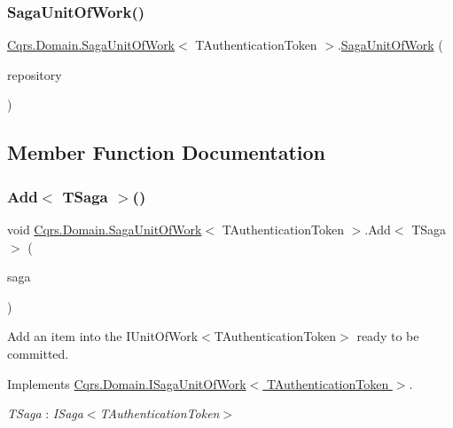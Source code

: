 \subsubsection{\texorpdfstring{Saga\+Unit\+Of\+Work()}{SagaUnitOfWork()}}
{\footnotesize\ttfamily \hyperlink{classCqrs_1_1Domain_1_1SagaUnitOfWork}{Cqrs.\+Domain.\+Saga\+Unit\+Of\+Work}$<$ T\+Authentication\+Token $>$.\hyperlink{classCqrs_1_1Domain_1_1SagaUnitOfWork}{Saga\+Unit\+Of\+Work} (\begin{DoxyParamCaption}\item[{\hyperlink{interfaceCqrs_1_1Domain_1_1ISagaRepository}{I\+Saga\+Repository}$<$ T\+Authentication\+Token $>$}]{repository }\end{DoxyParamCaption})}



\subsection{Member Function Documentation}
\mbox{\label{classCqrs_1_1Domain_1_1SagaUnitOfWork_af62fee98e76ec58ec4d684b36eb7b20e}} 
\subsubsection{\texorpdfstring{Add$<$ T\+Saga $>$()}{Add< TSaga >()}}
{\footnotesize\ttfamily void \hyperlink{classCqrs_1_1Domain_1_1SagaUnitOfWork}{Cqrs.\+Domain.\+Saga\+Unit\+Of\+Work}$<$ T\+Authentication\+Token $>$.Add$<$ T\+Saga $>$ (\begin{DoxyParamCaption}\item[{T\+Saga}]{saga }\end{DoxyParamCaption})}



Add an item into the I\+Unit\+Of\+Work$<$\+T\+Authentication\+Token$>$ ready to be committed. 



Implements \hyperlink{interfaceCqrs_1_1Domain_1_1ISagaUnitOfWork_a5e7c8e18a8d71fc915db48fac00e7da4}{Cqrs.\+Domain.\+I\+Saga\+Unit\+Of\+Work$<$ T\+Authentication\+Token $>$}.

\begin{Desc}
\item[Type Constraints]\begin{description}
\item[{\em T\+Saga} : {\em I\+Saga$<$T\+Authentication\+Token$>$}]\end{description}
\end{Desc}
\mbox{\label{classCqrs_1_1Domain_1_1SagaUnitOfWork_aed2756dadfe0a0903a791944d02c4db8}} 
